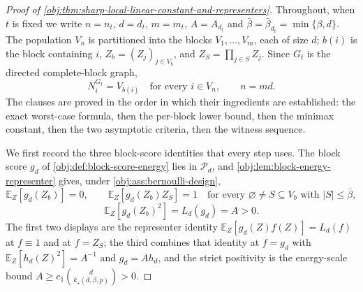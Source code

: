 \documentclass[11pt]{article}
\begin{document}
\begin{proof}[Proof of \cref{obj:thm:sharp-local-linear-constant-and-representers}]
Throughout, when \(t\) is fixed we write \(n=n_t\), \(d=d_t\), \(m=m_t\), \(A=A_{d_t}\) and \(\bar\beta=\bar\beta_{d_t}=\min\{\beta,d\}\).  The population \(V_{n}\) is partitioned into the blocks \(V_1,\ldots,V_m\), each of size \(d\); \(b(i)\) is the block containing \(i\), \(Z_b=(Z_j)_{j\in V_b}\), and \(Z_S=\prod_{j\in S}Z_j\).  Since \(G_t\) is the directed complete-block graph,
\[
N_i^{G_t}=V_{b(i)}\quad\text{for every }i\in V_{n},
\qquad
n=md .
\]
The clauses are proved in the order in which their ingredients are established: the exact worst-case formula, then the per-block lower bound, then the minimax constant, then the two asymptotic criteria, then the witness sequence.

We first record the three block-score identities that every step uses.  The block score \(g_{d}\) of \cref{obj:def:block-score-energy} lies in \(\mathcal P_{d}\), and \cref{obj:lem:block-energy-representer} gives, under \cref{obj:ass:bernoulli-design},
\[
\mathbb E_Z[g_{d}(Z_b)]=0,
\qquad
\mathbb E_Z[g_{d}(Z_b)Z_S]=1
\quad\text{for every }\varnothing\ne S\subseteq V_b\text{ with }|S|\le\bar\beta ,
\]
\[
\mathbb E_Z[g_{d}(Z_b)^2]=L_{d}(g_{d})=A>0 .
\]
The first two displays are the representer identity \(\mathbb E_Z[g_{d}(Z)f(Z)]=L_{d}(f)\) at \(f\equiv1\) and at \(f=Z_S\); the third combines that identity at \(f=g_{d}\) with \(\mathbb E_Z[h_{d}(Z)^2]=A^{-1}\) and \(g_{d}=Ah_{d}\), and the strict positivity is the energy-scale bound \(A\ge c_1\binom{d}{k_\star(d,\beta,p)}>0\). %


\end{proof}
\end{document}
